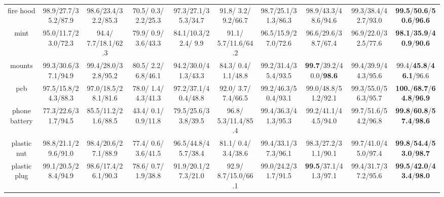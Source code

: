 \documentclass{article}
\theoremstyle{plain}
\theoremstyle{definition}
\theoremstyle{remark}
\begin{document}
\begin{table}[p]
{\begin{tabular}{ccccccccc>{\columncolor{oursblue}}c}
\cellcolor{rowgray} fire hood & \cellcolor{rowgray} 98.9/27.7/35.2/87.9 & \cellcolor{rowgray} 98.6/23.4/32.2/85.3 & \cellcolor{rowgray} 70.5/ 0.3/ 2.2/25.3 & \cellcolor{rowgray} 97.3/27.1/35.3/34.7 & \cellcolor{rowgray} 91.8/ 3.2/ 9.2/66.7 & \cellcolor{rowgray} 98.7/25.1/31.3/86.3 & \cellcolor{rowgray} 98.9/43.3/48.6/94.6 & \cellcolor{rowgray} 99.3/38.4/42.7/93.0 & \textbf{99.5}/\textbf{50.6}/\textbf{50.6}/\textbf{96.6} \\
mint             & 95.0/11.7/23.0/72.3 & 94.4/ 7.7/18.1/62.3 & 79.9/ 0.9/ 3.6/43.3 & 84.1/10.3/22.4/ 9.9 & 91.1/ 5.7/11.6/64.2 & 96.5/15.9/27.0/72.6 & 96.6/29.6/38.7/67.4 & 96.9/22.0/32.5/77.6 & \textbf{98.1}/\textbf{35.9}/\textbf{40.9}/\textbf{90.6} \\
\cellcolor{rowgray} mounts & \cellcolor{rowgray} 99.3/30.6/37.1/94.9 & \cellcolor{rowgray} 99.4/28.0/32.8/95.2 & \cellcolor{rowgray} 80.5/ 2.2/ 6.8/46.1 & \cellcolor{rowgray} 94.2/30.0/41.3/43.3 & \cellcolor{rowgray} 84.3/ 0.4/ 1.1/48.8 & \cellcolor{rowgray} 99.2/31.4/35.4/93.5 & \cellcolor{rowgray} \textbf{99.7}/39.2/40.0/\textbf{98.6} & \cellcolor{rowgray} 99.4/39.9/44.3/95.6 & 99.4/\textbf{45.8}/\textbf{46.1}/96.6 \\
pcb              & 97.5/15.8/24.3/88.3 & 97.0/18.5/28.1/81.6 & 78.0/ 1.4/ 4.3/41.3 & 97.2/37.1/40.4/48.8 & 92.0/ 3.7/ 7.4/66.5 & 99.2/46.3/50.4/93.1 & 99.0/48.8/51.2/92.1 & 99.3/55.0/56.3/95.7 & \textbf{100.}/\textbf{68.7}/\textbf{64.8}/\textbf{96.9} \\
\cellcolor{rowgray} phone battery & \cellcolor{rowgray} 77.3/22.6/31.7/94.5 & \cellcolor{rowgray} 85.5/11.2/21.6/88.5 & \cellcolor{rowgray} 43.4/ 0.1/ 0.9/11.8 & \cellcolor{rowgray} 79.5/25.6/33.8/39.5 & \cellcolor{rowgray} 96.8/ 5.3/11.4/85.4 & \cellcolor{rowgray} 99.4/36.3/41.3/95.3 & \cellcolor{rowgray} 99.2/41.1/44.5/94.0 & \cellcolor{rowgray} 99.7/51.6/54.2/96.8 & \textbf{99.8}/\textbf{60.8}/\textbf{57.4}/\textbf{98.6} \\
plastic nut      & 98.8/21.1/29.6/91.0 & 98.4/20.6/27.1/88.9 & 77.4/ 0.6/ 3.6/41.5 & 96.5/44.8/45.7/38.4 & 81.1/ 0.4/ 3.4/38.6 & 99.4/33.1/37.3/96.1 & 98.3/27.2/31.1/90.1 & 99.7/41.0/45.0/97.4 & \textbf{99.8}/\textbf{54.4}/\textbf{53.0}/\textbf{98.7} \\
\cellcolor{rowgray} plastic plug & \cellcolor{rowgray} 99.1/20.5/28.4/94.9 & \cellcolor{rowgray} 98.6/17.4/26.1/90.3 & \cellcolor{rowgray} 78.6/ 0.7/ 1.9/38.8 & \cellcolor{rowgray} 91.9/20.1/27.3/21.0 & \cellcolor{rowgray} 92.9/ 8.7/15.0/66.1 & \cellcolor{rowgray} 99.0/24.2/31.7/91.5 & \cellcolor{rowgray} \textbf{99.5}/37.1/41.3/97.1 & \cellcolor{rowgray} 99.4/31.7/37.2/95.6 & \textbf{99.5}/\textbf{42.0}/\textbf{43.4}/\textbf{98.0} \\

\end{tabular}}
\end{table}
\end{document}
